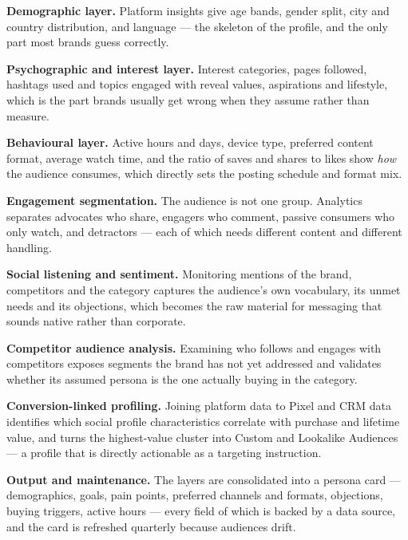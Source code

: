 \begin{qlist}
\begin{apts}
\item \textbf{Demographic layer.} Platform insights give age bands, gender
      split, city and country distribution, and language --- the skeleton of
      the profile, and the only part most brands guess correctly.
\item \textbf{Psychographic and interest layer.} Interest categories, pages
      followed, hashtags used and topics engaged with reveal values,
      aspirations and lifestyle, which is the part brands usually get wrong
      when they assume rather than measure.
\item \textbf{Behavioural layer.} Active hours and days, device type, preferred
      content format, average watch time, and the ratio of saves and shares to
      likes show \emph{how} the audience consumes, which directly sets the
      posting schedule and format mix.
\item \textbf{Engagement segmentation.} The audience is not one group.
      Analytics separates advocates who share, engagers who comment, passive
      consumers who only watch, and detractors --- each of which needs
      different content and different handling.
\item \textbf{Social listening and sentiment.} Monitoring mentions of the
      brand, competitors and the category captures the audience's own
      vocabulary, its unmet needs and its objections, which becomes the raw
      material for messaging that sounds native rather than corporate.
\item \textbf{Competitor audience analysis.} Examining who follows and engages
      with competitors exposes segments the brand has not yet addressed and
      validates whether its assumed persona is the one actually buying in the
      category.
\item \textbf{Conversion-linked profiling.} Joining platform data to Pixel and
      CRM data identifies which social profile characteristics correlate with
      purchase and lifetime value, and turns the highest-value cluster into
      Custom and Lookalike Audiences --- a profile that is directly actionable
      as a targeting instruction.
\item \textbf{Output and maintenance.} The layers are consolidated into a
      persona card --- demographics, goals, pain points, preferred channels and
      formats, objections, buying triggers, active hours --- every field of
      which is backed by a data source, and the card is refreshed quarterly
      because audiences drift.
\end{apts}


\end{qlist}
